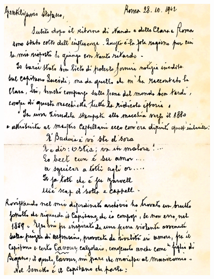  \begin{figure}[htb]
    \centering
    \includegraphics[width=\textwidth]{lettera}
    \caption[Lettera di Giuseppe De Maria]{}
    \vspace{-0.7cm}
\end{figure}

